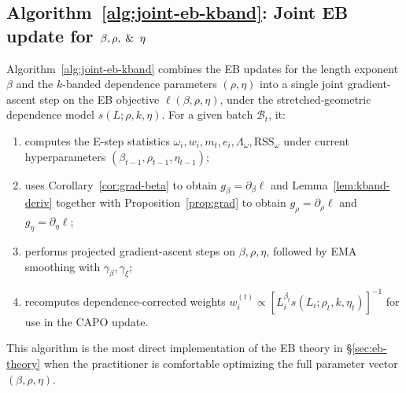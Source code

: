 \subsection{Algorithm~\ref{alg:joint-eb-kband}: Joint EB update for \texorpdfstring{$\beta, \rho, \And \eta$}{beta, rho and eta}}
Algorithm~\ref{alg:joint-eb-kband} combines the EB updates for the length exponent \(\beta\) and the $k$-banded dependence parameters \((\rho,\eta)\) into a single joint gradient-ascent step on the EB objective \(\ell(\beta,\rho,\eta)\), under the stretched-geometric dependence model \(s(L;\rho,k,\eta)\).
For a given batch \(\mathcal B_t\), it:
\begin{enumerate}
  \item computes the E-step statistics \(\omega_i, w_i, m_t, e_i, \Lambda_\omega, \mathrm{RSS}_\omega\) under current hyperparameters \((\beta_{t-1},\rho_{t-1},\eta_{t-1})\);
  \item uses Corollary~\ref{cor:grad-beta} to obtain \(g_\beta = \partial_\beta \ell\) and Lemma~\ref{lem:kband-deriv} together with Proposition~\ref{prop:grad} to obtain \(g_\rho = \partial_\rho \ell\) and \(g_\eta = \partial_\eta \ell\);
  \item performs projected gradient-ascent steps on \(\beta,\rho,\eta\), followed by EMA smoothing with \(\gamma_\beta,\gamma_\xi\);
  \item recomputes dependence-corrected weights \(w_i^{(t)}\propto [L_i^{\beta_t}s(L_i;\rho_t,k,\eta_t)]^{-1}\) for use in the CAPO update.
\end{enumerate}
This algorithm is the most direct implementation of the EB theory in \S\ref{sec:eb-theory} when the practitioner is comfortable optimizing the full parameter vector \((\beta,\rho,\eta)\).


